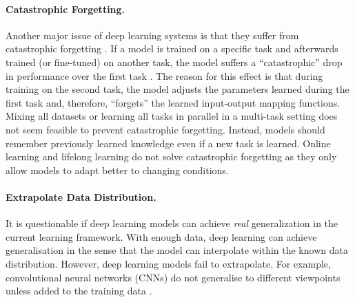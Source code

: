 \paragraph{Catastrophic Forgetting.} Another major issue of deep learning systems is that they suffer from catastrophic forgetting .
If a model is trained on a specific task and afterwards trained (or fine-tuned) on another task, the model suffers a ``catastrophic'' drop in performance over the first task \cite{kirkpatrick_overcoming_2017}.
The reason for this effect is that during training on the second task, the model adjusts the parameters learned during the first task and, therefore, ``forgets'' the learned input-output mapping functions.
Mixing all datasets or learning all tasks in parallel in a multi-task setting  does not seem feasible to prevent catastrophic forgetting. Instead, models should remember previously learned knowledge even if a new task is learned.
Online learning  and lifelong learning  do not solve catastrophic forgetting as they only allow models to adapt better to changing conditions.

\paragraph{Extrapolate Data Distribution.} It is questionable if deep learning models can achieve \emph{real} generalization in the current learning framework.
With enough data, deep learning can achieve generalisation in the sense that the model can interpolate within the known data distribution.
However, deep learning models fail to extrapolate.
For example, convolutional neural networks (CNNs) do not generalise to different viewpoints unless added to the training data .

